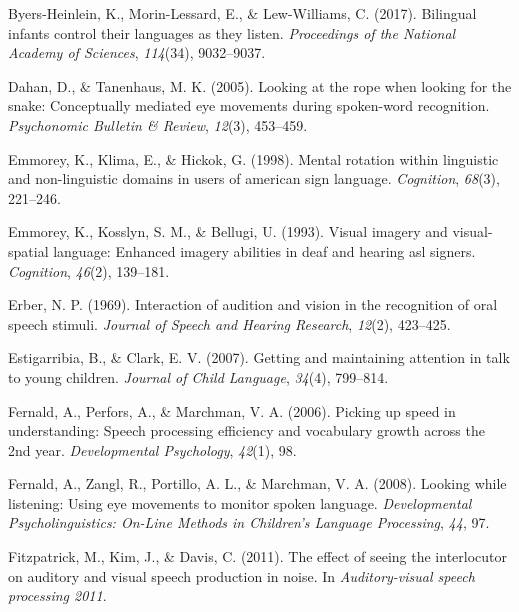 \documentclass[english,floatsintext,man]{apa6}
\begin{document}
\leavevmode\hypertarget{ref-byers2017bilingual}{}%
Byers-Heinlein, K., Morin-Lessard, E., \& Lew-Williams, C. (2017).
Bilingual infants control their languages as they listen.
\emph{Proceedings of the National Academy of Sciences}, \emph{114}(34),
9032--9037.

\leavevmode\hypertarget{ref-dahan2005looking}{}%
Dahan, D., \& Tanenhaus, M. K. (2005). Looking at the rope when looking
for the snake: Conceptually mediated eye movements during spoken-word
recognition. \emph{Psychonomic Bulletin \& Review}, \emph{12}(3),
453--459.

\leavevmode\hypertarget{ref-emmorey1998mental}{}%
Emmorey, K., Klima, E., \& Hickok, G. (1998). Mental rotation within
linguistic and non-linguistic domains in users of american sign
language. \emph{Cognition}, \emph{68}(3), 221--246.

\leavevmode\hypertarget{ref-emmorey1993visual}{}%
Emmorey, K., Kosslyn, S. M., \& Bellugi, U. (1993). Visual imagery and
visual-spatial language: Enhanced imagery abilities in deaf and hearing
asl signers. \emph{Cognition}, \emph{46}(2), 139--181.

\leavevmode\hypertarget{ref-erber1969interaction}{}%
Erber, N. P. (1969). Interaction of audition and vision in the
recognition of oral speech stimuli. \emph{Journal of Speech and Hearing
Research}, \emph{12}(2), 423--425.

\leavevmode\hypertarget{ref-estigarribia2007getting}{}%
Estigarribia, B., \& Clark, E. V. (2007). Getting and maintaining
attention in talk to young children. \emph{Journal of Child Language},
\emph{34}(4), 799--814.

\leavevmode\hypertarget{ref-fernald2006picking}{}%
Fernald, A., Perfors, A., \& Marchman, V. A. (2006). Picking up speed in
understanding: Speech processing efficiency and vocabulary growth across
the 2nd year. \emph{Developmental Psychology}, \emph{42}(1), 98.

\leavevmode\hypertarget{ref-fernald2008looking}{}%
Fernald, A., Zangl, R., Portillo, A. L., \& Marchman, V. A. (2008).
Looking while listening: Using eye movements to monitor spoken language.
\emph{Developmental Psycholinguistics: On-Line Methods in Children's
Language Processing}, \emph{44}, 97.

\leavevmode\hypertarget{ref-fitzpatrick2011effect}{}%
Fitzpatrick, M., Kim, J., \& Davis, C. (2011). The effect of seeing the
interlocutor on auditory and visual speech production in noise. In
\emph{Auditory-visual speech processing 2011}.
\end{document}
